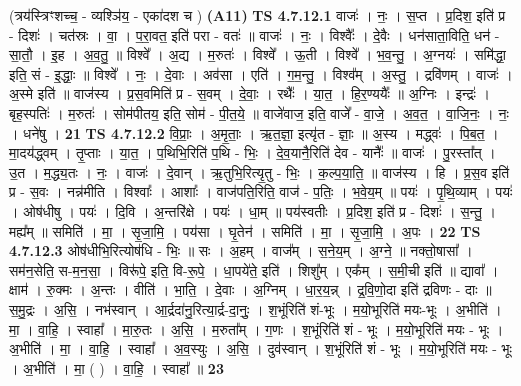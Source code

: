\documentclass[17pt]{extarticle}
\begin{document}
                  \newline
                      (त्रय॑स्त्रिꣳशच्च॒ - व्यश्ञि॑य॒ - एका॑दश च )  \textbf{(A11)} \newline \newline
                                \textbf{ TS 4.7.12.1} \newline
                  वाजः॑ । नः॒ । स॒प्त । प्र॒दिश॒ इति॑ प्र - दिशः॑ । चत॑स्रः । वा॒ । प॒रा॒वत॒ इति॑ परा - वतः॑ ॥ वाजः॑ । नः॒ । विश्वैः᳚ । दे॒वैः । धन॑साता॒विति॒ धन॑ - सा॒तौ॒ । इ॒ह । अ॒व॒तु॒ ॥ विश्वे᳚ । अ॒द्य । म॒रुतः॑ । विश्वे᳚ । ऊ॒ती । विश्वे᳚ । भ॒व॒न्तु॒ । अ॒ग्नयः॑ । समि॑द्धा॒ इति॒ सं - इ॒द्धाः॒ ॥ विश्वे᳚ । नः॒ । दे॒वाः । अव॑सा । एति॑ । ग॒म॒न्तु॒ । विश्व᳚म् । अ॒स्तु॒ । द्रवि॑णम् । वाजः॑ । अ॒स्मे इति॑ ॥ वाज॑स्य । प्र॒स॒वमिति॑ प्र - स॒वम् । दे॒वाः॒ । रथैः᳚ । या॒त॒ । हि॒र॒ण्ययैः᳚ ॥ अ॒ग्निः । इन्द्रः॑ । बृह॒स्पतिः॑ । म॒रुतः॑ । सोम॑पीतय॒ इति॒ सोम॑ - पी॒त॒ये॒ ॥ वाजे॑वाज॒ इति॒ वाजे᳚ - वा॒जे॒ । अ॒व॒त॒ । वा॒जि॒नः॒ । नः॒ । धने॑षु । \textbf{  21} \newline
                  \newline
                                \textbf{ TS 4.7.12.2} \newline
                  वि॒प्राः॒ । अ॒मृ॒ताः॒ । ऋ॒त॒ज्ञा॒ इत्यृ॑त - ज्ञाः॒ ॥ अ॒स्य । मद्ध्वः॑ । पि॒ब॒त॒ । मा॒दय॑द्ध्वम् । तृ॒प्ताः । या॒त॒ । प॒थिभि॒रिति॑ प॒थि - भिः॒ । दे॒व॒यानै॒रिति॑ देव - यानैः᳚ ॥ वाजः॑ । पु॒रस्ता᳚त् । उ॒त । म॒द्ध्य॒तः । नः॒ । वाजः॑ । दे॒वान् । ऋ॒तुभि॒रित्यृ॒तु - भिः॒ । क॒ल्प॒या॒ति॒ ॥ वाज॑स्य । हि । प्र॒स॒व इति॑ प्र - स॒वः । नन्न॑मीति । विश्वाः᳚ । आशाः᳚ । वाज॑पति॒रिति॒ वाज॑ - प॒तिः॒ । भ॒वे॒य॒म् ॥ पयः॑ । पृ॒थि॒व्याम् । पयः॑ । ओष॑धीषु । पयः॑ । दि॒वि । अ॒न्तरि॑क्षे । पयः॑ । धा॒म् ॥ पय॑स्वतीः । प्र॒दिश॒ इति॑ प्र - दिशः॑ । स॒न्तु॒ । मह्य᳚म् ॥ समिति॑ । मा॒ । सृ॒जा॒मि॒ । पय॑सा । घृ॒तेन॑ । समिति॑ । मा॒ । सृ॒जा॒मि॒ । अ॒पः । \textbf{  22} \newline
                  \newline
                                \textbf{ TS 4.7.12.3} \newline
                  ओष॑धीभि॒रित्योष॑धि - भिः॒ ॥ सः । अ॒हम् । वाज᳚म् । स॒ने॒य॒म् । अ॒ग्ने॒ ॥ नक्तो॒षासा᳚ । सम॑न॒सेति॒ स-म॒न॒सा॒ । विरू॑पे॒ इति॒ वि-रू॒पे॒ । धा॒पये॑ते॒ इति॑ । शिशु᳚म् । एक᳚म् । स॒मी॒ची इति॑ ॥ द्यावा᳚ । क्षाम॑ । रु॒क्मः । अ॒न्तः । वीति॑ । भा॒ति॒ । दे॒वाः । अ॒ग्निम् । धा॒र॒य॒न्न् । द्र॒वि॒णो॒दा इति॑ द्रविणः - दाः ॥ स॒मु॒द्रः । अ॒सि॒ । नभ॑स्वान् । आ॒र्द्रदा॑नु॒रित्या॒र्द्र-दा॒नुः॒ । श॒भूंरिति॑ शं-भूः । म॒यो॒भूरिति॑ मयः-भूः । अ॒भीति॑ । मा॒ । वा॒हि॒ । स्वाहा᳚ । मा॒रु॒तः । अ॒सि॒ । म॒रुता᳚म् । ग॒णः । श॒भूंरिति॑ शं - भूः । म॒यो॒भूरिति॑ मयः - भूः । अ॒भीति॑ । मा॒ । वा॒हि॒ । स्वाहा᳚ । अ॒व॒स्युः । अ॒सि॒ । दुव॑स्वान् । श॒भूंरिति॑ शं - भूः । म॒यो॒भूरिति॑ मयः - भूः । अ॒भीति॑ । मा॒ ( ) । वा॒हि॒ । स्वाहा᳚ ॥ \textbf{  23} \newline
\end{document}
